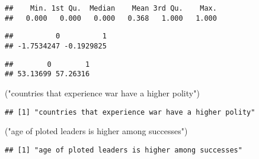 \documentclass[
]{article}
\newenvironment{Shaded}{\begin{snugshade}}{\end{snugshade}}
\newcommand{\DecValTok}[1]{\textcolor[rgb]{0.00,0.00,0.81}{#1}}
\newcommand{\KeywordTok}[1]{\textcolor[rgb]{0.13,0.29,0.53}{\textbf{#1}}}
\newcommand{\NormalTok}[1]{#1}
\newcommand{\OperatorTok}[1]{\textcolor[rgb]{0.81,0.36,0.00}{\textbf{#1}}}
\newcommand{\StringTok}[1]{\textcolor[rgb]{0.31,0.60,0.02}{#1}}
\begin{document}
\begin{verbatim}
##    Min. 1st Qu.  Median    Mean 3rd Qu.    Max. 
##   0.000   0.000   0.000   0.368   1.000   1.000
\end{verbatim}

\begin{Shaded}
\end{Shaded}

\begin{verbatim}
##          0          1 
## -1.7534247 -0.1929825
\end{verbatim}

\begin{Shaded}
\end{Shaded}

\begin{verbatim}
##        0        1 
## 53.13699 57.26316
\end{verbatim}

\begin{Shaded}
\begin{Highlighting}[]
\NormalTok{(}\StringTok{"countries that experience war have a higher polity"}\NormalTok{)}
\end{Highlighting}
\end{Shaded}

\begin{verbatim}
## [1] "countries that experience war have a higher polity"
\end{verbatim}

\begin{Shaded}
\begin{Highlighting}[]
\NormalTok{(}\StringTok{"age of ploted leaders is higher among successes"}\NormalTok{)}
\end{Highlighting}
\end{Shaded}

\begin{verbatim}
## [1] "age of ploted leaders is higher among successes"
\end{verbatim}
\end{document}
